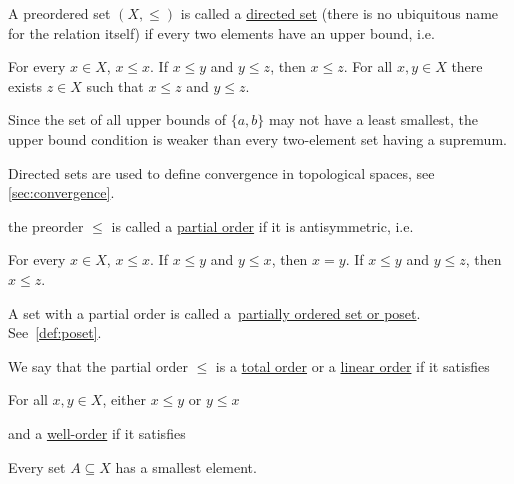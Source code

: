 \begin{definition}
\begin{defenum}
    \item\label{def:order/directed}\cite[8]{Engelking1989} A preordered set $(X, \leq)$ is called a \ul{directed set} (there is no ubiquitous name for the relation itself) if every two elements have an upper bound, i.e.
    \begin{description}
       For every $x \in X$, $x \leq x$.
       If $x \leq y$ and $y \leq z$, then $x \leq z$.
       For all $x, y \in X$ there exists $z \in X$ such that $x \leq z$ and $y \leq z$.
    \end{description}

    Since the set of all upper bounds of $\{ a, b \}$ may not have a least smallest, the upper bound condition is weaker than every two-element set having a supremum.

    Directed sets are used to define convergence in topological spaces, see \cref{sec:convergence}.

    \item\label{def:order/partial}\cite[7]{Engelking1989} the preorder $\leq$ is called a \ul{partial order} if it is antisymmetric, i.e.
    \begin{description}
       For every $x \in X$, $x \leq x$.
       If $x \leq y$ and $y \leq x$, then $x = y$.
       If $x \leq y$ and $y \leq z$, then $x \leq z$.
    \end{description}

    A set with a partial order is called a~\ul{partially ordered set or poset}. See~\cref{def:poset}.

    We say that the partial order $\leq$ is a \ul{total order} or a \ul{linear order} if it satisfies
    \begin{description}
       For all $x, y \in X$, either $x \leq y$ or $y \leq x$
    \end{description}
    and a \ul{well-order} if it satisfies
    \begin{description}
       Every set $A \subseteq X$ has a smallest element.
    \end{description}


\end{defenum}
\end{definition}
